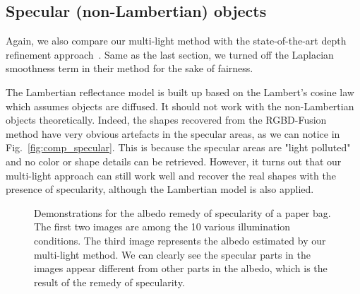 \subsection{Specular (non-Lambertian) objects}
Again, we also compare our multi-light method with the state-of-the-art depth refinement approach~\cite{or2015rgbd}.
Same as the last section, we turned off the Laplacian smoothness term in their method for the sake of fairness.

The Lambertian reflectance model is built up based on the Lambert's cosine law which assumes objects are diffused.
It should not work with the non-Lambertian objects theoretically.
Indeed, the shapes recovered from the RGBD-Fusion method have very obvious artefacts in the specular areas, as we can notice in Fig.~\ref{fig:comp_specular}.
This is because the specular areas are "light polluted" and no color or shape details can be retrieved.
However, it turns out that our multi-light approach can still work well and recover the real shapes with the presence of specularity, although the Lambertian model is also applied.
\begin{figure}[H]
\centering
{}
\caption{Demonstrations for the albedo remedy of specularity of a paper bag. The first two images are among the 10 various illumination conditions. The third image represents the albedo estimated by our multi-light method. We can clearly see the specular parts in the images appear different from other parts in the albedo, which is the result of the remedy of specularity.}
\label{fig:specular_illu}
\end{figure}

